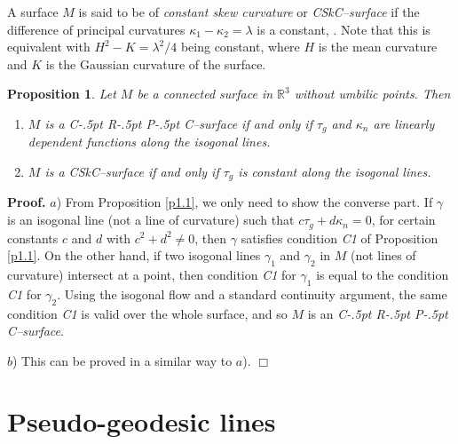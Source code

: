\documentclass[11pt,a4paper]{article}
\def\R#1{\ensuremath{\mathbb{R}^{#1}}}
\def\g{\gamma}
\newenvironment{proof}{\ignorespaces\par\noindent\textbf{Proof.}\quad}{\hfill$\Box$\par}
\def\CRPC{C\kern-.5pt R\kern-.5pt P\kern-.5pt C}
\def\CSkC{CSkC}
\newtheorem{prop}[theo]{Proposition}
\begin{document}
A surface $M$ is said to be of \emph{constant skew curvature} or \emph{\CSkC--surface} if the difference of principal curvatures $\kappa_1-\kappa_2=\lambda$ is a constant, \cite{TP17}. Note that this is equivalent with $H^2-K=\lambda^2/4$ being constant, where $H$ is the mean curvature and $K$ is the Gaussian curvature of the surface.

\begin{prop}\label{prop3}%
Let $M$ be a connected surface in $\R3$ without umbilic points. Then\vspace*{-\topsep}
\begin{enumerate}\itemsep0pt
\item $M$ is a \CRPC--surface if and only if $\tau_g$ and $\kappa_n$ are linearly dependent functions along the  isogonal lines.
\item $M$ is a \CSkC--surface if and only if $\tau_g$ is constant along the isogonal lines.
\end{enumerate}
\end{prop}
\begin{proof}
$a$) From Proposition \ref{p1.1}, we only need to show the converse part. If $\gamma$ is an  isogonal line (not a line of curvature) such that $c\tau_g+d\kappa_n=0$, for certain constants $c$ and $d$ with $c^2+d^2\neq0$, then $\gamma$ satisfies condition \emph{C1} of Proposition \ref{p1.1}. On the other hand, if two isogonal lines $\g_1$ and $\g_2$ in $M$ (not lines of curvature) intersect at a point, then condition \emph{C1} for $\g_1$ is equal to the condition \emph{C1} for $\g_2$. Using the isogonal flow and a standard continuity argument, the same condition \emph{C1} is valid over the whole surface, and so $M$ is an \emph{\CRPC--surface}.\par%
\noindent $b$) This can be proved in a similar way to $a$).
\end{proof}

\section{Pseudo-geodesic lines}
\label{s:CCNS}\label{s:PGL}
\end{document}
